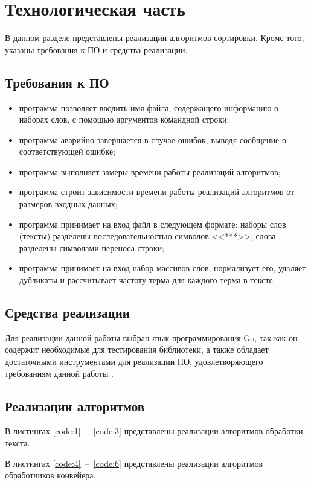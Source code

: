 \chapter{Технологическая часть}

В данном разделе представлены реализации алгоритмов сортировки. Кроме того, указаны требования к ПО и средства реализации.

\section{Требования к ПО}
\begin{itemize}
	\item программа позволяет вводить имя файла, содержащего информацию о наборах слов, с помощью аргументов командной строки;
	\item программа аварийно завершается в случае ошибок, выводя сообщение о соответствующей ошибке;
	\item программа выполняет замеры времени работы реализаций алгоритмов;
	\item программа строит зависимости времени работы реализаций алгоритмов от размеров входных данных;
	\item программа принимает на вход файл в следующем формате: наборы слов (тексты) разделены последовательностью символов <<***>>, слова разделены символами переноса строки;
	\item программа принимает на вход набор массивов слов, нормализует его, удаляет дубликаты и рассчитывает частоту терма для каждого терма в тексте.
\end{itemize}

\section{Средства реализации}
Для реализации данной работы выбран язык программирования Go, так как он содержит необходимые для тестирования библиотеки, а также обладает достаточными инструментами для реализации ПО, удовлетворяющего требованиям данной работы \cite{bib:3}.

\section{Реализации алгоритмов}
В листингах \ref{code:1}~--~\ref{code:3} представлены реализации алгоритмов обработки текста.

В листингах \ref{code:4}~--~\ref{code:6} представлены реализации алгоритмов обработчиков конвейера.


